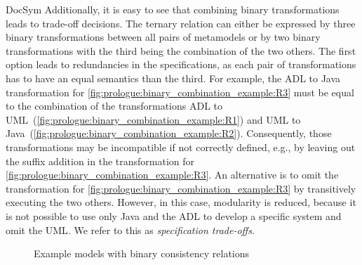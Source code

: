 \begin{copiedFrom}{DocSym}
Additionally, it is easy to see that %
combining binary transformations leads to trade-off decisions.
The ternary relation %
can either be expressed by three binary transformations between all pairs of metamodels or by two binary transformations with the third being %
the combination of the two others.
The first option leads to redundancies in the specifications, as each pair of transformations has to have an equal semantics than the third.
For example, the \ac{ADL} to Java transformation for \ref{fig:prologue:binary_combination_example:R3} must be equal to the combination of the transformations \ac{ADL} to \ac{UML}~(\ref{fig:prologue:binary_combination_example:R1}) and \ac{UML} to Java~(\ref{fig:prologue:binary_combination_example:R2}).
Consequently, those transformations may be incompatible if not correctly defined, e.g., by leaving out the suffix addition in the transformation for \ref{fig:prologue:binary_combination_example:R3}.
An alternative is to omit the transformation for \ref{fig:prologue:binary_combination_example:R3} by transitively executing the two others.
However, in this case, modularity is reduced, because it is not possible to use only Java and the \ac{ADL} to develop a specific system and omit the \ac{UML}.
We refer to this as \emph{specification trade-offs}.

\begin{figure}
    \centering
    
    \caption{Example models with binary consistency relations}
    \label{fig:prologue:binary_combination_example}
\end{figure}


\end{copiedFrom}
